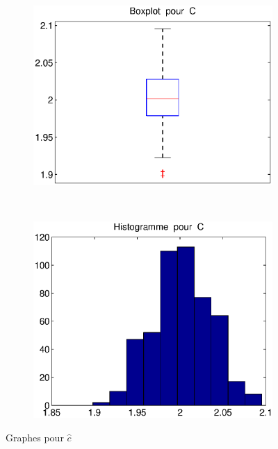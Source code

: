\begin{figure}[!ht]
        \centering
        \begin{subfigure}[b]{0.5\textwidth}
                \includegraphics[width=\textwidth]{graphes/boxplot_cmg.eps}
        \end{subfigure}%
        ~
        \begin{subfigure}[b]{0.5\textwidth}
                \includegraphics[width=\textwidth]{graphes/hist_cmg.eps}
        \end{subfigure}
        \caption{Graphes pour $\hat{c}$}\label{fig:cmg}
\end{figure}

